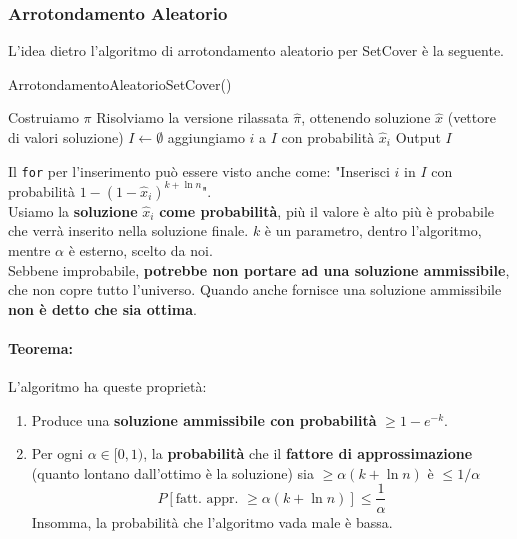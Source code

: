 \newpage

\subsubsection{Arrotondamento Aleatorio}

L'idea dietro l'algoritmo di arrotondamento aleatorio per SetCover è la seguente.

\begin{algorithm}
	\caption{ArrotondamentoAleatorioSetCover()}
	\begin{algorithmic}
		\STATE Costruiamo $\pi$
		\STATE Risolviamo la versione rilassata $\hat \pi$, ottenendo soluzione $\hat x$ (vettore di valori soluzione)
		\STATE $I \leftarrow \emptyset$
				\STATE aggiungiamo $i$ a $I$ con probabilità $\hat x_i$ 
			\ENDFOR
		\ENDFOR
		\STATE Output $I$
	\end{algorithmic}
\end{algorithm}

Il \texttt{for} per l'inserimento può essere visto anche come: "Inserisci $i$ in $I$ con probabilità $1 - (1-\hat x_i)^{k + \ln n}$".\\

Usiamo la \textbf{soluzione} $\hat x_i$ \textbf{come probabilità}, più il valore è alto più è probabile che verrà inserito nella soluzione finale. $k$ è un parametro, dentro l'algoritmo, mentre $\alpha$ è esterno, scelto da noi.\\

Sebbene improbabile, \textbf{potrebbe non portare ad una soluzione ammissibile}, che non copre tutto l'universo. Quando anche fornisce una soluzione ammissibile \textbf{non è detto che sia ottima}.\\

\newpage

\paragraph{Teorema:} L'algoritmo ha queste proprietà:
\begin{enumerate}
	\item Produce una \textbf{soluzione ammissibile con probabilità} $\geq 1 - e^{-k}$.\\
	
	\item Per ogni $\alpha \in [0,1)$, la \textbf{probabilità} che il \textbf{fattore di approssimazione} (quanto lontano dall'ottimo è la soluzione) sia $\geq \alpha (k + \ln n)$ è $\leq 1/\alpha$
	$$ P[\text{fatt. appr. } \geq \alpha (k + \ln n)] \leq \frac{1}{\alpha} $$
	Insomma, la probabilità che l'algoritmo vada male è bassa.\\
\end{enumerate}

